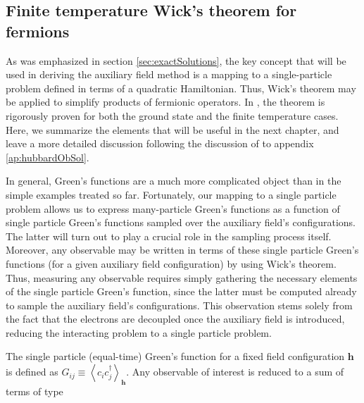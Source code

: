 \subsection{Finite temperature Wick's theorem for fermions}
\label{subsec:wick}

As was emphasized in section \ref{sec:exactSolutions}, the key concept that will be used in deriving the auxiliary field method is a mapping to a single-particle problem defined in terms of a quadratic Hamiltonian.
Thus, Wick's theorem may be applied to simplify products of fermionic operators.
In \cite{fetter_quantum_2003}, the theorem is rigorously proven for both the ground state and the finite temperature cases.
Here, we summarize the elements that will be useful in the next chapter, and leave a more detailed discussion following the discussion of \cite{molinari_notes_2017} to appendix \ref{ap:hubbardObSol}.

In general, Green's functions are a much more complicated object than in the simple examples treated so far.
Fortunately, our mapping to a single particle problem allows us to express many-particle Green's functions as a function of single particle Green's functions sampled over the auxiliary field's configurations.
The latter will turn out to play a crucial role in the sampling process itself.
Moreover, any observable may be written in terms of these single particle Green's functions (for a given auxiliary field configuration) by using Wick's theorem.
Thus, measuring any observable requires simply gathering the necessary elements of the single particle Green's function, since the latter must be computed already to sample the auxiliary field's configurations.
This observation stems solely from the fact that the electrons are decoupled once the auxiliary field is introduced, reducing the interacting problem to a single particle problem.

The single particle (equal-time) Green's function for a fixed field configuration $\bm h$ is defined as $G_{ij} \equiv \left\langle c_i c_j^\dagger \right\rangle_{\bm h}$.
Any observable of interest is reduced to a sum of terms of type

